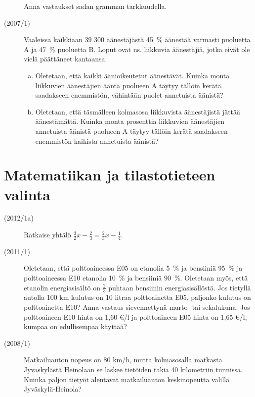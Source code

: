 \begin{description}
    	Anna vastaukset sadan gramman tarkkuudella.

	\item[(2007/1)] Vaaleissa kaikkiaan 39 300 äänestäjästä 45~\% äänestää varmasti
        puoluetta A ja 47~\% puoluetta B. Loput ovat ns. liikkuvia äänestäjiä,
        jotka eivät ole vielä päättäneet kantaansa.
	
    	\begin{enumerate}[(a)]
    		\item Oletetaan, että kaikki äänioikeutetut äänestävät. Kuinka monta
                liikkuvien äänestäjien ääntä puolueen A täytyy tällöin kerätä
                saadakseen enemmistön, vähintään puolet annetuista äänistä?
    		\item Oletetaan, että täsmälleen kolmasosa liikkuvista äänestäjistä
                jättää äänestämättä. Kuinka monta prosenttia liikkuvien äänestäjien
                annetuista äänistä puolueen A täytyy tällöin kerätä saadakseen 
    		    enemmistön kaikista annetuista äänistä?
    	\end{enumerate}	 	
	
\end{description}

\section{Matematiikan ja tilastotieteen valinta}

\begin{description}
	\item[(2012/1a)] Ratkaise yhtälö $\frac{3}{2}x - \frac{2}{3} = \frac{2}{3}x - \frac{1}{4}$.
	\item[(2011/1)] Oletetaan, että polttoaineessa E05 on etanolia 5~\% ja
        bensiiniä 95~\% ja polttoaineessa E10 etanolia 10~\% ja bensiiniä 90~\%.
        Oletetaan myös, että etanolin energiasisältö on $\frac{2}{3}$ puhtaan bensiinin
		energiasisällöstä. Jos tietyllä autolla 100 km kulutus on 10 litraa
        polttoainetta E05, paljonko kulutus on polttoainetta E10? Anna vastaus
        sievennettynä murto- tai sekalukuna. Jos polttoaineen E10 hinta on 1,60 €/l
        ja polttoaineen E05 hinta on 1,65 €/l, kumpaa on edullisempaa käyttää?
	\item[(2008/1)] Matkailuauton nopeus on 80 km/h, mutta kolmasosalla matkasta
        Jyvaskylästä Heinolaan se laskee tietöiden takia 40 kilometriin tunnissa.
        Kuinka paljon tietyöt alentavat matkailuauton keskinopeutta valillä Jyväskylä-Heinola?
\end{description}

